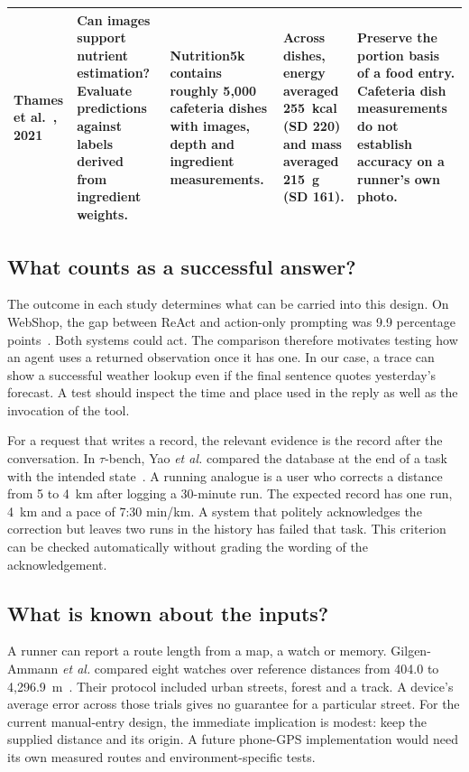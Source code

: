 \documentclass[conference]{IEEEtran}
\begin{document}
\begin{table}[t]
\begin{tabularx}{\textwidth}{@{}p{2.10cm}YYYY@{}}
Thames et al.~\cite{nutri}, 2021 & Can images support nutrient estimation? Evaluate predictions against labels derived from ingredient weights. & Nutrition5k contains roughly 5,000 cafeteria dishes with images, depth and ingredient measurements. & Across dishes, energy averaged 255~kcal (SD 220) and mass averaged 215~g (SD 161). & Preserve the portion basis of a food entry. Cafeteria dish measurements do not establish accuracy on a runner's own photo.\\\bottomrule
\end{tabularx}
\end{table}


\subsection{What counts as a successful answer?}
The outcome in each study determines what can be carried into this design. On WebShop, the gap between ReAct and action-only prompting was 9.9 percentage points~\cite{react}. Both systems could act. The comparison therefore motivates testing how an agent uses a returned observation once it has one. In our case, a trace can show a successful weather lookup even if the final sentence quotes yesterday's forecast. A test should inspect the time and place used in the reply as well as the invocation of the tool.

For a request that writes a record, the relevant evidence is the record after the conversation. In $\tau$-bench, Yao \emph{et al.} compared the database at the end of a task with the intended state~\cite{tau}. A running analogue is a user who corrects a distance from 5 to 4~km after logging a 30-minute run. The expected record has one run, 4~km and a pace of 7:30 min/km. A system that politely acknowledges the correction but leaves two runs in the history has failed that task. This criterion can be checked automatically without grading the wording of the acknowledgement.

\subsection{What is known about the inputs?}
A runner can report a route length from a map, a watch or memory. Gilgen-Ammann \emph{et al.} compared eight watches over reference distances from 404.0 to 4,296.9~m~\cite{gnss}. Their protocol included urban streets, forest and a track. A device's average error across those trials gives no guarantee for a particular street. For the current manual-entry design, the immediate implication is modest: keep the supplied distance and its origin. A future phone-GPS implementation would need its own measured routes and environment-specific tests.
\end{document}
